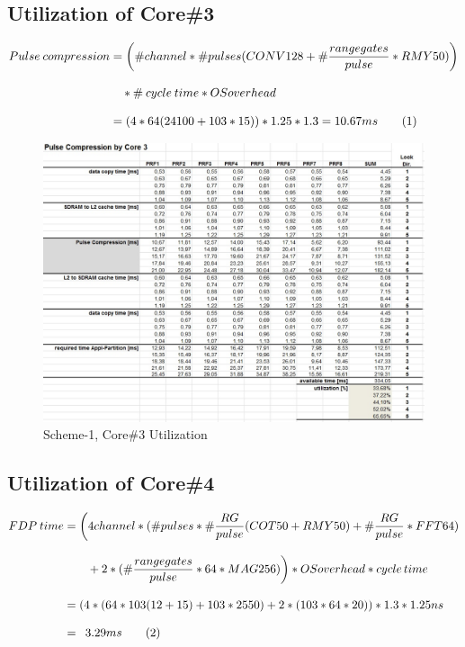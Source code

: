 \subsection{Utilization of Core\#3}
\begin{align*}
	\label{aa:scheme1:core3:equ}
	Pulse \: compression &= \bigg(\#channel * \#pulses (CONV128 +  \# \frac{range gates}{pulse} * RMY50)\bigg)\\[0.3cm]  
	& \quad * \# \: cycle \: time * OSoverhead\\[0.3cm] 
	&= (4 * 64 (24100 + 103 * 15)) * 1.25 * 1.3 = 10.67ms   \stepcounter{equation}\tag{\theequation} 
\end{align*}
\begin{figure}[h!]
	\centering
	\includegraphics[width=160mm]{figures/aa_scheme1_cpu_util_3}
	\caption{Scheme-1, Core\#3 Utilization}
	\label{fig:existing_analysis:aa_scheme1_cpu_util3}
\end{figure}

\subsection{Utilization of Core\#4}
\begin{align*}
	\label{aa:scheme1:core4:equ1}
	FDP \: time &= \bigg(4channel * (\#pulses * \# \frac{RG}{pulse} (COT50 + RMY50) + \# \frac{RG}{pulse} * FFT64) \\[0.3cm] 
	& \qquad + 2 * (\# \frac{range gates}{pulse} * 64 * MAG256)\bigg) * OSoverhead * cycle \, time \\[0.3cm]
	&= (4 * (64 * 103 (12 + 15) + 103 * 2550) + 2 * (103 * 64 * 20)) * 1.3 * 1.25ns \enspace \\[0.3cm]
	&= \enspace 3.29ms  \stepcounter{equation}\tag{\theequation} 
\end{align*}

